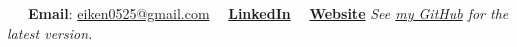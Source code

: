 \documentclass[letterpaper, 11pt]{article}
\begin{document}


\vspace{0.5cm} 
\noindent\:\ \ \ 
\textbf{Email}: \href{mailto:eiken0525@gmail.com}{eiken0525@gmail.com} 
\qquad \ \ 
\href{https://www.linkedin.com/in/eiken59}{\textbf{LinkedIn}} 
\qquad \ \ 
\href{https://sites.google.com/view/eiken59/}{\textbf{Website}}
\hfill 
\textit{\footnotesize See \href{https://github.com/eiken59/CV/blob/main/eiken59_CV.pdf}{my GitHub} for the latest version.\ \ \ \ \,}


\setlength{\tabcolsep}{8pt}
\vspace{-1.5em}
\end{document}
